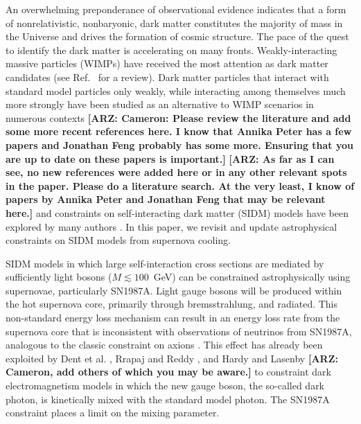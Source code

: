\documentclass[nofootinbib,prd,superscriptaddress,twocolumn]{revtex4}
\newcommand{\arz}[1]{{{\bf{\color{BrickRed}[ARZ: #1]}}}}
\begin{document}
An overwhelming preponderance of observational evidence indicates that a form of nonrelativistic, nonbaryonic, 
dark matter constitutes the majority of mass in the Universe and drives the formation of cosmic structure. 
The pace of the quest to identify the dark matter is accelerating on many fronts. Weakly-interacting massive 
particles (WIMPs) have received the most attention as dark matter candidates (see Ref.~\cite{jungman_etal96} for a review). 
Dark matter particles that interact with standard model particles only weakly, while interacting among themselves 
much more strongly have been studied as an alternative to WIMP scenarios in numerous contexts 
\cite{carlson_etal92,deLaix_etal95,atrio-barandela_davidson97,spergel_steinhardt00,hogan_dalcanton00,mohapatra_teplitz00,
dave_etal01,hisano_etal04,hisano_etal05,pospelov_etal08,arkani-hamed_etal08a,lattanzi_silk08,ackerman_etal09,feng_etal09,
kong_etal15} \arz{Cameron: Please review the literature and add some more recent references here. 
I know that Annika Peter has a few papers and Jonathan Feng probably has some more. 
Ensuring that you are up to date on these papers is important.} \arz{As far as I can see, no new 
references were added here or in any other relevant spots in the paper. Please do a literature search. At the very least, 
I know of papers by Annika Peter and Jonathan Feng that may be relevant here.}
and constraints on self-interacting dark matter (SIDM) models have been explored by many authors \cite{yoshida_etal00,gnedin_ostriker01,miralda-escude02,randall_etal08,kamionkowski_profumo08,zentner09,robertson_zentner09,pieri_etal09,spolyar_etal09,finkbeiner_etal09,slatyer_etal09,bramante_etal14,albuquerque_etal14,kaplinghat_etal14,chen_etal14,feng_etal16,catena_widmark16}. In this paper, we revisit and update astrophysical constraints on SIDM models from supernova cooling.


SIDM models in which large self-interaction cross sections are mediated by sufficiently light 
bosons ($M \lesssim 100$~GeV) can be constrained astrophysically using supernovae, particularly 
SN1987A. Light gauge bosons will be produced within the hot supernova core, primarily through 
bremsstrahlung, and radiated. This non-standard energy loss mechanism can result in an energy loss rate 
from the supernova core that is inconsistent with observations of neutrinos from SN1987A, 
analogous to the classic constraint on axions \cite{turner88,raffelt96_book}. 
This effect has already been exploited by Dent et al. \cite{dent_etal12}, Rrapaj and Reddy \cite{rrapaj_reddy16}, and 
Hardy and Lasenby \cite{hardy_lasenby17} \arz{Cameron, add others of which you may be aware.}
to constraint dark electromagnetism models in which the new gauge boson, the so-called dark photon, 
is kinetically mixed with the standard model photon. The SN1987A constraint places a limit on the mixing parameter. 
\end{document}

